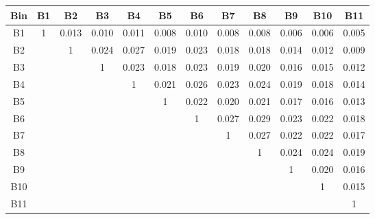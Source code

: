 \begin{tabular}{c@{~~~}c@{~~}c@{~~}c@{~~}c@{~~}c@{~~}c@{~~}c@{~~}c@{~~}c@{~~}c@{~~}c}
\hline 
 \hline 
Bin	& B1 & B2 & B3 & B4 & B5 & B6 & B7 & B8 & B9 & B10 & B11 \\ 
\hline 
B1	&  1 &  0.013 &  0.010 &  0.011 &  0.008 &  0.010 &  0.008 &  0.008 &  0.006 &  0.006 &  0.005 \\  
B2	&   &  1 &  0.024 &  0.027 &  0.019 &  0.023 &  0.018 &  0.018 &  0.014 &  0.012 &  0.009 \\  
B3	&   &   &  1 &  0.023 &  0.018 &  0.023 &  0.019 &  0.020 &  0.016 &  0.015 &  0.012 \\  
B4	&   &   &   &  1 &  0.021 &  0.026 &  0.023 &  0.024 &  0.019 &  0.018 &  0.014 \\  
B5	&   &   &   &   &  1 &  0.022 &  0.020 &  0.021 &  0.017 &  0.016 &  0.013 \\  
B6	&   &   &   &   &   &  1 &  0.027 &  0.029 &  0.023 &  0.022 &  0.018 \\  
B7	&   &   &   &   &   &   &  1 &  0.027 &  0.022 &  0.022 &  0.017 \\  
B8	&   &   &   &   &   &   &   &  1 &  0.024 &  0.024 &  0.019 \\  
B9	&   &   &   &   &   &   &   &   &  1 &  0.020 &  0.016 \\  
B10	&   &   &   &   &   &   &   &   &   &  1 &  0.015 \\  
B11	&   &   &   &   &   &   &   &   &   &   &  1 \\  
\hline 
 \hline 
\end{tabular}